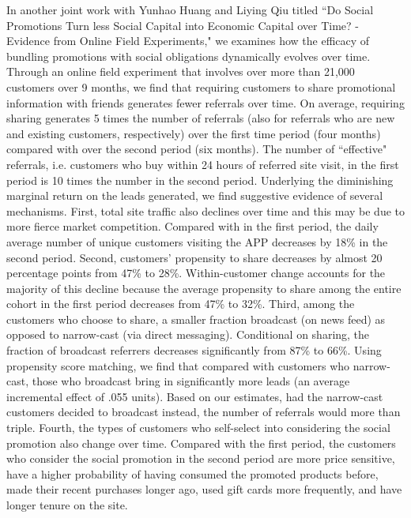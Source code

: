 \documentclass{article}
\begin{document}
In another joint work with Yunhao Huang and Liying Qiu titled “Do Social Promotions Turn less Social Capital into Economic Capital over Time? - Evidence from Online Field Experiments," we examines how the efficacy of bundling promotions with social obligations dynamically evolves over time. Through an online field experiment that involves over more than 21,000 customers over 9 months, we find that requiring customers to share promotional information with friends generates fewer referrals over time. On average, requiring sharing generates 5 times the number of referrals (also for referrals who are new and existing customers, respectively) over the first time period (four months) compared with over the second period (six months). The number of ``effective" referrals, i.e. customers who buy within 24 hours of referred site visit, in the first period is 10 times the number in the second period. Underlying the diminishing marginal return on the leads generated, we find suggestive evidence of several mechanisms. First, total site traffic also declines over time and this may be due to more fierce market competition. Compared with in the first period, the daily average number of unique customers visiting the APP decreases by 18\% in the second period. Second, customers' propensity to share decreases by almost 20 percentage points from 47\% to 28\%. Within-customer change accounts for the majority of this decline because the average propensity to share among the entire cohort in the first period decreases from 47\% to 32\%. Third, among the customers who choose to share, a smaller fraction broadcast (on news feed) as opposed to narrow-cast (via direct messaging). Conditional on sharing, the fraction of broadcast referrers decreases significantly from 87\% to 66\%. Using propensity score matching, we find that compared with customers who narrow-cast, those  who broadcast bring in significantly more leads (an average incremental effect of .055 units). Based on our estimates, had the narrow-cast customers decided to broadcast instead, the number of referrals would more than triple. Fourth, the types of customers who self-select into considering the social promotion also change over time. Compared with the first period, the customers who consider the social promotion in the second period are more price sensitive, have a higher probability of having consumed the promoted products before, made their recent purchases longer ago, used gift cards more frequently, and have longer tenure on the site. 
\noindent
\raggedright
\end{document}
